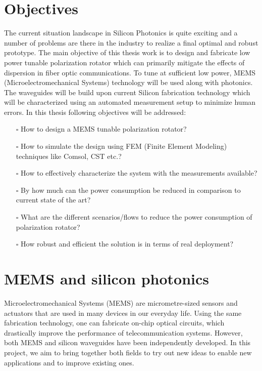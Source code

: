 \documentclass[../main.tex]{subfiles}
\begin{document}
	\section{Objectives}
The current situation landscape in Silicon Photonics is quite exciting and a number of problems are there in the industry to realize a final optimal and robust prototype. The main objective of this thesis work is to design and fabricate low power tunable polarization rotator which can primarily mitigate the effects of dispersion in fiber optic communications. To tune at sufficient low power, MEMS (Microelectromechanical Systems) technology will be used along with photonics. The waveguides will be build upon current Silicon fabrication technology which will be characterized using an automated measurement setup to minimize human errors. In this thesis following objectives will be addressed:
\begin{itemize}
	\item[$\square$] How to design a MEMS tunable polarization rotator?
	\item[$\square$]  How to simulate the design using FEM (Finite Element Modeling) techniques like Comsol, CST etc.?
	\item[$\square$]  How to effectively characterize the system with the measurements available?
	\item[$\square$]  By how much can the power consumption be reduced in comparison to current state of the art?
	\item[$\square$]  What are the different scenarios/flows to reduce the power consumption of polarization rotator?
	\item[$\square$]  How robust and efficient the solution is in terms of real deployment?
\end{itemize}

	\section{MEMS and silicon photonics}
Microelectromechanical Systems (MEMS) are micrometre-sized sensors and actuators that are used in many devices in our everyday life. Using the same fabrication technology, one can fabricate on-chip optical circuits, which drastically improve the performance of telecommunication systems. However, both MEMS and silicon waveguides have been independently developed. In this project, we aim to bring together both fields to try out new ideas to enable new applications and to improve existing ones.
	
\end{document}
